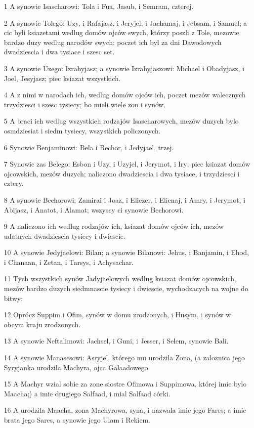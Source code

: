 \par 1 A synowie Isascharowi: Tola i Fua, Jasub, i Semram, czterej.
\par 2 A synowie Tolego: Uzy, i Rafajasz, i Jeryjel, i Jachamaj, i Jebsam, i Samuel; a cic byli ksiazetami wedlug domów ojców swych, którzy poszli z Tole, mezowie bardzo duzy wedlug narodów swych; poczet ich byl za dni Dawodowych dwadziescia i dwa tysiace i szesc set.
\par 3 A synowie Uzego: Izrahyjasz; a synowie Izrahyjaszowi: Michael i Obadyjasz, i Joel, Jesyjasz; piec ksiazat wszystkich.
\par 4 A z nimi w narodach ich, wedlug domów ojców ich, poczet mezów walecznych trzydziesci i szesc tysiecy; bo mieli wiele zon i synów.
\par 5 A braci ich wedlug wszystkich rodzajów Isascharowych, mezów duzych bylo osmdziesiat i siedm tysiecy, wszystkich policzonych.
\par 6 Synowie Benjaminowi: Bela i Bechor, i Jedyjael, trzej.
\par 7 Synowie zas Belego: Esbon i Uzy, i Uzyjel, i Jerymot, i Iry; piec ksiazat domów ojcowskich, mezów duzych; naliczono dwadziescia i dwa tysiace, i trzydziesci i cztery.
\par 8 A synowie Bechorowi; Zamirai i Joaz, i Eliezer, i Elienaj, i Amry, i Jerymot, i Abijasz, i Anatot, i Alamat; wszyscy ci synowie Bechorowi.
\par 9 A naliczono ich wedlug rodzajów ich, ksiazat domów ojców ich, mezów udatnych dwadziescia tysiecy i dwiescie.
\par 10 A synowie Jedyjaelowi: Bilan; a synowie Bilanowi: Jehus, i Banjamin, i Ehod, i Chanaan, i Zetan, i Tarsys, i Achysachar.
\par 11 Tych wszystkich synów Jadyjaelowych wedlug ksiazat domów ojcowskich, mezów bardzo duzych siedmnascie tysiecy i dwiescie, wychodzacych na wojne do bitwy;
\par 12 Oprócz Suppim i Ofim, synów w domu zrodzonych, i Husym, i synów w obcym kraju zrodzonych.
\par 13 A synowie Neftalimowi: Jachsel, i Guni, i Jesser, i Selem, synowie Bali.
\par 14 A synowie Manasesowi: Asryjel, którego mu urodzila Zona, (a zaloznica jego Syryjanka urodzila Machyra, ojca Galaadowego.
\par 15 A Machyr wzial sobie za zone siostre Ofimowa i Suppimowa, której imie bylo Maacha;) a imie drugiego Salfaad, i mial Salfaad córki.
\par 16 A urodzila Maacha, zona Machyrowa, syna, i nazwala imie jego Fares; a imie brata jego Sares, a synowie jego Ulam i Rekiem.
